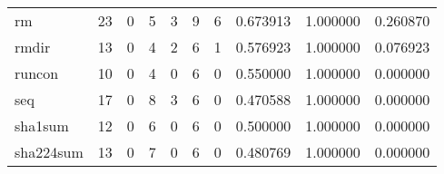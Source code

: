 \begin{tabular}{lrrrrrrrrr}
rm        &                                       23 &                                                  0 &                                                  5 &                                                  3 &                                                  9 &                                                  6 &                                           0.673913 &                               1.000000 &                             0.260870 \\
rmdir     &                                       13 &                                                  0 &                                                  4 &                                                  2 &                                                  6 &                                                  1 &                                           0.576923 &                               1.000000 &                             0.076923 \\
runcon    &                                       10 &                                                  0 &                                                  4 &                                                  0 &                                                  6 &                                                  0 &                                           0.550000 &                               1.000000 &                             0.000000 \\
seq       &                                       17 &                                                  0 &                                                  8 &                                                  3 &                                                  6 &                                                  0 &                                           0.470588 &                               1.000000 &                             0.000000 \\
sha1sum   &                                       12 &                                                  0 &                                                  6 &                                                  0 &                                                  6 &                                                  0 &                                           0.500000 &                               1.000000 &                             0.000000 \\
sha224sum &                                       13 &                                                  0 &                                                  7 &                                                  0 &                                                  6 &                                                  0 &                                           0.480769 &                               1.000000 &                             0.000000 \\

\end{tabular}
